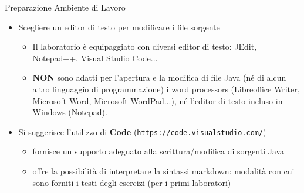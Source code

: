 \documentclass[xcolor=dvipsnames,presentation]{beamer}
\begin{document}

\begin{frame}{Preparazione Ambiente di Lavoro}
    \begin{itemize}
        \item Scegliere un editor di testo per modificare i file sorgente
        \begin{itemize}
            \item Il laboratorio è equipaggiato con diversi editor di testo: JEdit, Notepad++, Visual Studio Code...
            \item \textbf{NON} sono adatti per l'apertura e la modifica di file Java
            (né di alcun altro linguaggio di programmazione) i word processors (Libreoffice Writer, Microsoft Word, Microsoft WordPad...), né l'editor di testo incluso in Windows (Notepad).
        \end{itemize}
        \item Si suggerisce l'utilizzo di \textbf{Code} (\texttt{https://code.visualstudio.com/})
        \begin{itemize}
            \item fornisce un supporto adeguato alla scrittura/modifica di sorgenti Java
            \item offre la possibilità di interpretare la sintassi markdown: modalità con cui sono forniti i testi degli esercizi (per i primi laboratori)
        \end{itemize}
    \end{itemize}
\end{frame}
\end{document}
